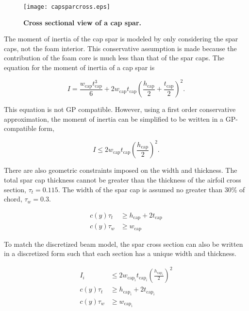 \begin{figure}[H]
	\begin{center}
	\texttt{[image: capsparcross.eps]}
    \caption{\textbf{Cross sectional view of a cap spar.}}
	\label{f:capspar}
	\end{center}
\end{figure}

The moment of inertia of the cap spar is modeled by only considering the spar caps, not the foam interior.  
This conservative assumption is made because the contribution of the foam core is much less than that of the spar caps.  
The equation for the moment of inertia\cite{bending} of a cap spar is 

\begin{equation}
    \label{e:moispar}
    I = \frac{w_{\text{cap}}t_{\text{cap}}^3}{6} + 2w_{\text{cap}}t_{\text{cap}}\left( \frac{h_{\text{cap}}}{2} + \frac{t_{\text{cap}}}{2} \right)^2.
\end{equation}

This equation is not GP compatible.  However, using a first order conservative approximation, the moment of inertia can be simplified to be written in a GP-compatible form, 

\begin{equation}
    \label{e:moispar}
    I \leq 2w_{\text{cap}}t_{\text{cap}}\left(\frac{h_{\text{cap}}}{2}\right)^2.
\end{equation}

There are also geometric constraints imposed on the width and thickness.  The total spar cap thickness cannot be greater than the thickness of the airfoil cross section, $\tau_t = 0.115$.  The width of the spar cap is assumed no greater than 30\% of chord, $\tau_w = 0.3$.

\begin{align}
    \label{e:thickness}
    c(y)\tau_t &\geq h_{\text{cap}} + 2t_{\text{cap}} \\
    \label{e:width}
    c(y)\tau_w &\geq w_{\text{cap}} 
    \end{align}

To match the discretized beam model, the spar cross section can also be written in a discretized form such that each section has a unique width and thickness. 

\begin{align}
    I_i &\leq 2w_{\text{cap}_i}t_{\text{cap}_i}\left(\frac{h_{\text{cap}_i}}{2}\right)^2 \\
    c(y)\tau_t &\geq h_{\text{cap}_i} + 2t_{\text{cap}_i} \\
    c(y)\tau_w &\geq w_{\text{cap}_i} 
\end{align}

